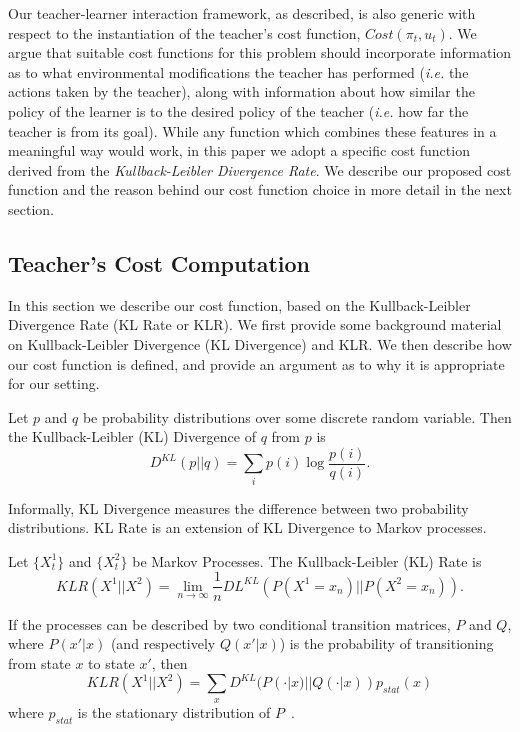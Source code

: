 Our teacher-learner interaction framework, as described, is also
generic with respect to the instantiation of the teacher's cost
function, $Cost(\pi_t,u_t)$. We argue that suitable cost functions for
this problem should incorporate information as to what environmental
modifications the teacher has performed (\emph{i.e.} the actions taken
by the teacher), along with information about how similar the policy
of the learner is to the desired policy of the teacher (\emph{i.e.}
how far the teacher is from its goal). While any function which
combines these features in a meaningful way would work, in this paper
we adopt a specific cost function derived from the
\emph{Kullback-Leibler Divergence Rate}.  We describe our proposed
cost function and the reason behind our cost function choice in more
detail in the next section.



\subsection{Teacher's Cost Computation}\label{sec:KLCost}

In this section we describe our cost function, based on the
Kullback-Leibler Divergence Rate (KL Rate or KLR).  We first provide some
background material on Kullback-Leibler Divergence (KL Divergence) and
KLR. We then describe how our cost function is defined, and provide an
argument as to why it is appropriate for our setting.


\begin{Definition}
Let $p$ and $q$ be probability distributions over some discrete random
variable. Then the Kullback-Leibler (KL) Divergence of $q$ from $p$ is
\[
D^{KL}(p||q)=\sum_i p(i)\log \frac{p(i)}{q(i)}.
\]
\end{Definition}

\noindent Informally, KL Divergence measures the difference between
two probability distributions.  KL Rate is an extension of KL
Divergence to Markov processes.
\begin{Definition}
Let $\{X^1_t\}$ and $\{X^2_t\}$ be Markov Processes.  The
Kullback-Leibler (KL) Rate is
\[
KLR(X^1||X^2)=\lim_{n\rightarrow \infty} \frac{1}{n}DL^{KL}(P(X^1=x_n)||P(X^2=x_n)).
\]
\end{Definition}
If the processes can be described by two conditional transition
matrices, $P$ and $Q$, where $P(x'|x)$ (and respectively $Q(x'|x)$) is
the probability of transitioning from state $x$ to state $x'$, then
\[
KLR(X^1||X^2)=\sum_{x} D^{KL}(P(\cdot|x)||Q(\cdot|x))p_{stat}(x)
\]
where $p_{stat}$ is the stationary distribution of
$P$~\cite{rached_alajaji_campbell_2004}.


